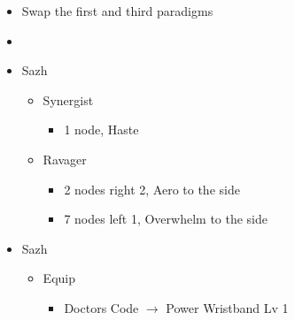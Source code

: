 \documentclass{report}
\begin{document}
\begin{menu}
\begin{itemize}
    \paradigm
    \begin{itemize}
        \item Swap the first and third paradigms
        \item {}%
{\paradigmline{\textit{\syn}}{\textit{\sab}}{}}%
{\paradigmline{\com}{\med}{}}%
{\paradigmline{\com}{\rav}{}}%
{\paradigmline{\rav}{\rav}{}}%
{\paradigmline{[\rav]}{(\sab)}{}}%
{\paradigmline{[\com]}{(\sab)}{}}
    \end{itemize}
    \crystarium
    \begin{itemize}
        \item Sazh
        \begin{itemize}
            \item Synergist
            \begin{itemize}
                \item 1 node, Haste
            \end{itemize}
            \item Ravager
            \begin{itemize}
                \item 2 nodes right 2, Aero to the side
                \item 7 nodes left 1, Overwhelm to the side
            \end{itemize}
        \end{itemize}
    \end{itemize}
    \equip
    \begin{itemize}
        \item Sazh
        \begin{itemize}
            \item Equip
            \begin{itemize}
                \item Doctors Code $\rightarrow$ Power Wristband Lv 1
            \end{itemize}
        \end{itemize}
    \end{itemize}
\end{itemize}
\end{menu}

\renewcommand{\first}{[1] Tide Turner (\syn/\sab)}
\renewcommand{\second}{[2] War and Peace (\com/\med)}
\renewcommand{\third}{[3] Slash \& Burn (\com/\rav)}
\renewcommand{\fourth}{[4] Dualcasting (\rav/\rav)}
\renewcommand{\fifth}{[5] Undermind (\rav/\sab)}
\renewcommand{\sixth}{[6] Divide \& Conquer (\com/\sab)}
\end{document}
